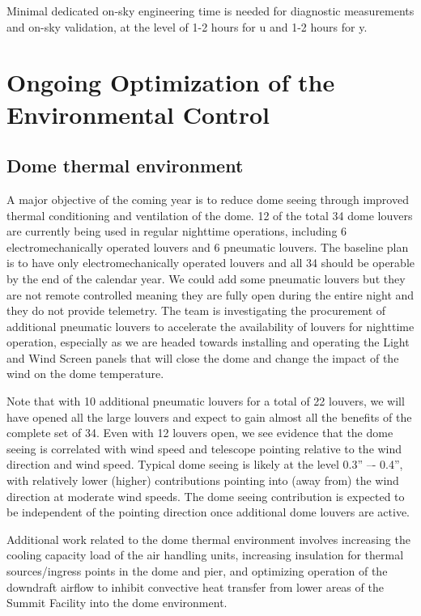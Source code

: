 \documentclass[SO,lsst,authoryear,toc]{lsstdoc}
\begin{document}
Minimal dedicated on-sky engineering time is needed for diagnostic measurements and on-sky validation, at the level of 1-2 hours for u and 1-2 hours for y.

\section{Ongoing Optimization of the Environmental Control}
\label{sec:environment}

\subsection{Dome thermal environment}
\label{sec:dome}

A major objective of the coming year is to reduce dome seeing through improved thermal conditioning and ventilation of the dome. 12 of the total 34 dome louvers are currently being used in regular nighttime operations, including 6 electromechanically operated louvers and 6 pneumatic louvers.
The baseline plan is to have only electromechanically operated louvers and all 34 should be operable by the end of the calendar year.
We could add some pneumatic louvers but they are not remote controlled meaning they are fully open during the entire night and  they do not provide telemetry.
The team is investigating the procurement of additional pneumatic louvers to accelerate the availability of louvers for nighttime operation, especially as we are headed towards installing and operating the Light and Wind Screen panels that will close the dome and change the impact of the wind on the dome temperature.

Note that with 10 additional pneumatic louvers for a total of 22 louvers, we will have opened all the large louvers and expect to gain almost all the benefits of the complete set of 34. Even with 12 louvers open, we see evidence that the dome seeing is correlated with wind speed and telescope pointing relative to the wind direction and wind speed.
Typical dome seeing is likely at the level 0.3'' –- 0.4'', with relatively lower (higher) contributions pointing into (away from) the wind direction at moderate wind speeds.
The dome seeing contribution is expected to be independent of the pointing direction once additional dome louvers are active.

Additional work related to the dome thermal environment involves increasing the cooling capacity load of the air handling units, increasing insulation for thermal sources/ingress points in the dome and pier, and optimizing operation of the downdraft airflow to inhibit convective heat transfer from lower areas of the Summit Facility into the dome environment.
\end{document}
